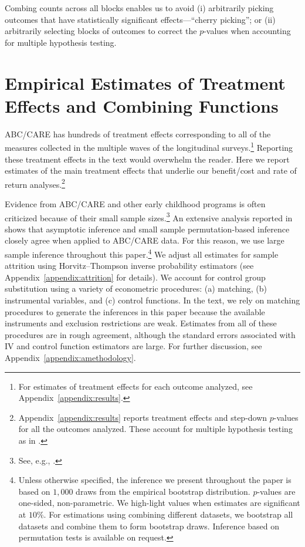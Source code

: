 Combing counts across all blocks enables us to avoid (i) arbitrarily picking outcomes that have statistically significant effects---``cherry picking''; or (ii) arbitrarily selecting blocks of outcomes to correct the $p$-values when accounting for multiple hypothesis testing.

\section{Empirical Estimates of Treatment Effects and Combining Functions}\label{section:c-functions}

ABC/CARE has hundreds of treatment effects corresponding to all of the measures collected in the multiple waves of the longitudinal surveys.\footnote{For estimates of treatment effects for each outcome analyzed, see Appendix~\ref{appendix:results}.} Reporting these treatment effects in the text would overwhelm the reader. Here we report estimates of the main treatment effects that underlie our benefit/cost and rate of return analyses.\footnote{Appendix~\ref{appendix:results} reports treatment effects and step-down $p$-values for all the outcomes analyzed. These account for multiple hypothesis testing as in \citet{Lehman_Romano_2005_AnnStat,Romano_Shaikh_2006_AnnStat}.}

Evidence from ABC/CARE and other early childhood programs is often criticized because of their small sample sizes.\footnote{See, e.g., \cite{Murray_2013_GivingKids_JJHBOOK}.} An extensive analysis reported in \citet{Campbell_Conti_etal_2014_EarlyChildhoodInvestments} shows that asymptotic inference and small sample permutation-based inference closely agree when applied to ABC/CARE data. For this reason, we use large sample inference throughout this paper.\footnote{Unless otherwise specified, the inference we present throughout the paper is based on $1,000$ draws from the empirical bootstrap distribution. $p$-values are one-sided, non-parametric. We high-light values when estimates are significant at $10\%$. For estimations using combining different datasets, we bootstrap all datasets and combine them to form bootstrap draws. Inference based on permutation tests is available on request.} We adjust all estimates for sample attrition using Horvitz--Thompson \citeyearpar{Horvitz_Thompson_1952_JASA} inverse probability estimators (see Appendix~\ref{appendix:attrition} for details). We account for control group substitution using a variety of econometric procedures: (a) matching, (b) instrumental variables, and (c) control functions. In the text, we rely on matching procedures to generate the inferences in this paper because the available instruments and exclusion restrictions are weak. Estimates from all of these procedures are in rough agreement, although the standard errors associated with IV and control function estimators are large. For further discussion, see Appendix~\ref{appendix:amethodology}.

